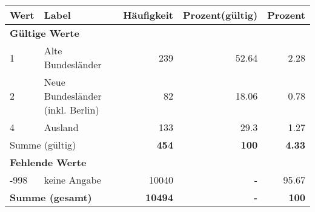      \begin{longtable}{lXrrr}
     \toprule
     \textbf{Wert} & \textbf{Label} & \textbf{Häufigkeit} & \textbf{Prozent(gültig)} & \textbf{Prozent} \\
     \endhead
     \midrule
     \multicolumn{5}{l}{\textbf{Gültige Werte}}\\

     1 &
     \multicolumn{1}{X}{ Alte Bundesländer   } &


       \num{239} &
       \num[round-mode=places,round-precision=2]{52.64} &
         \num[round-mode=places,round-precision=2]{2.28} \\

     2 &
     \multicolumn{1}{X}{ Neue Bundesländer (inkl. Berlin)   } &


       \num{82} &
       \num[round-mode=places,round-precision=2]{18.06} &
         \num[round-mode=places,round-precision=2]{0.78} \\

     4 &
     \multicolumn{1}{X}{ Ausland   } &


       \num{133} &
       \num[round-mode=places,round-precision=2]{29.3} &
         \num[round-mode=places,round-precision=2]{1.27} \\
     \midrule
     \multicolumn{2}{l}{Summe (gültig)} &
       \textbf{\num{454}} &
     \textbf{\num{100}} &
       \textbf{\num[round-mode=places,round-precision=2]{4.33}} \\
     \multicolumn{5}{l}{\textbf{Fehlende Werte}}\\
       -998 &
       keine Angabe &
         \num{10040} &
        - &
         \num[round-mode=places,round-precision=2]{95.67} \\
     \midrule
     \multicolumn{2}{l}{\textbf{Summe (gesamt)}} &
          \textbf{\num{10494}} &
        \textbf{-} &
        \textbf{\num{100}} \\
     \bottomrule
     \end{longtable}
     
